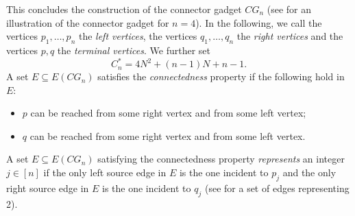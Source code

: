 This concludes the construction of the connector gadget $CG_n$  (see  for an illustration of the connector gadget for $n = 4$). In the following, we call the vertices $p_1,\ldots,p_n$ the \emph{left vertices}, the vertices $q_1,\ldots,q_n$ the \emph{right vertices} and the vertices $p,q$ the \emph{terminal vertices}. We further set 
\[
C_n^* = 4N^2+(n-1)N+n-1.
\]
A set $E \subseteq E(CG_n)$ satisfies the \emph{connectedness} property if the following hold in $E$:
\begin{itemize}
\item $p$ can be reached from some right vertex and from some left vertex;
\item $q$ can be reached from some right vertex and from some left vertex.
\end{itemize}
A set $E \subseteq E(CG_n)$ satisfying the connectedness property \emph{represents} an integer $j \in [n]$ if the only left source edge in $E$ is the one incident to $p_j$ and the only right source edge in $E$ is the one incident to $q_j$ (see  for a set of edges representing 2).

